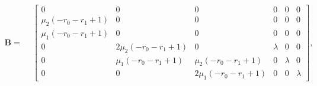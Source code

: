 \begin{gather*}
	\boldsymbol{B}=
	\!\begin{aligned}
		&
		\left[\begin{matrix}0 & 0 & 0 & 0 & 0 & 0\\\mu_{2} \left(- r_{0} - r_{1} + 1\right) & 0 & 0 & 0 & 0 & 0\\\mu_{1} \left(- r_{0} - r_{1} + 1\right) & 0 & 0 & 0 & 0 & 0\\0 & 2 \mu_{2} \left(- r_{0} - r_{1} + 1\right) & 0 & \lambda & 0 & 0\\0 & \mu_{1} \left(- r_{0} - r_{1} + 1\right) & \mu_{2} \left(- r_{0} - r_{1} + 1\right) & 0 & \lambda & 0\\0 & 0 & 2 \mu_{1} \left(- r_{0} - r_{1} + 1\right) & 0 & 0 & \lambda\end{matrix}\right],
	\end{aligned}
\end{gather*}

